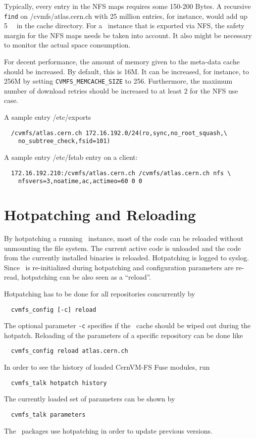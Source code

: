 Typically, every entry in the NFS maps requires some 150-200 Bytes. 
A recursive \texttt{find} on /cvmfs/atlas.cern.ch with 25 million entries, for instance, would add up \SI{5}{\giga\byte} in the cache directory. 
For a \cvmfs\ instance that is exported via NFS, the safety margin for the NFS maps needs be taken into account.
It also might be necessary to monitor the actual space consumption.

For decent performance, the amount of memory given to the meta-data cache should be increased. 
By default, this is 16M.
It can be increased, for instance, to 256M by setting \texttt{CVMFS\_MEMCACHE\_SIZE} to 256.
Furthermore, the maximum number of download retries should be increased to at least 2 for the NFS use case. 

A sample entry /etc/exports
\begin{verbatim}
  /cvmfs/atlas.cern.ch 172.16.192.0/24(ro,sync,no_root_squash,\
    no_subtree_check,fsid=101)
\end{verbatim}
A sample entry /etc/fstab entry on a client:
\begin{verbatim}
  172.16.192.210:/cvmfs/atlas.cern.ch /cvmfs/atlas.cern.ch nfs \
    nfsvers=3,noatime,ac,actimeo=60 0 0
\end{verbatim}


\section{Hotpatching and Reloading}
\label{sct:hotpatch}

By hotpatching a running \cvmfs\ instance, most of the code can be reloaded without unmounting the file system.
The current active code is unloaded and the code from the currently installed binaries is reloaded.
Hotpatching is logged to syslog.
Since \cvmfs\ is re-initialized during hotpatching and configuration parameters are re-read, hotpatching can be also seen as a ``reload''.

Hotpatching has to be done for all repositories concurrently by
\begin{verbatim}
  cvmfs_config [-c] reload
\end{verbatim}
The optional parameter \texttt{-c} specifies if the \cvmfs\ cache should be wiped out during the hotpatch.
Reloading of the parameters of a specific repository can be done like
\begin{verbatim}
  cvmfs_config reload atlas.cern.ch
\end{verbatim}
In order to see the history of loaded CernVM-FS Fuse modules, run
\begin{verbatim}
  cvmfs_talk hotpatch history
\end{verbatim}
The currently loaded set of parameters can be shown by
\begin{verbatim}
  cvmfs_talk parameters
\end{verbatim}
The \cvmfs\ packages use hotpatching in order to update previous versions.


